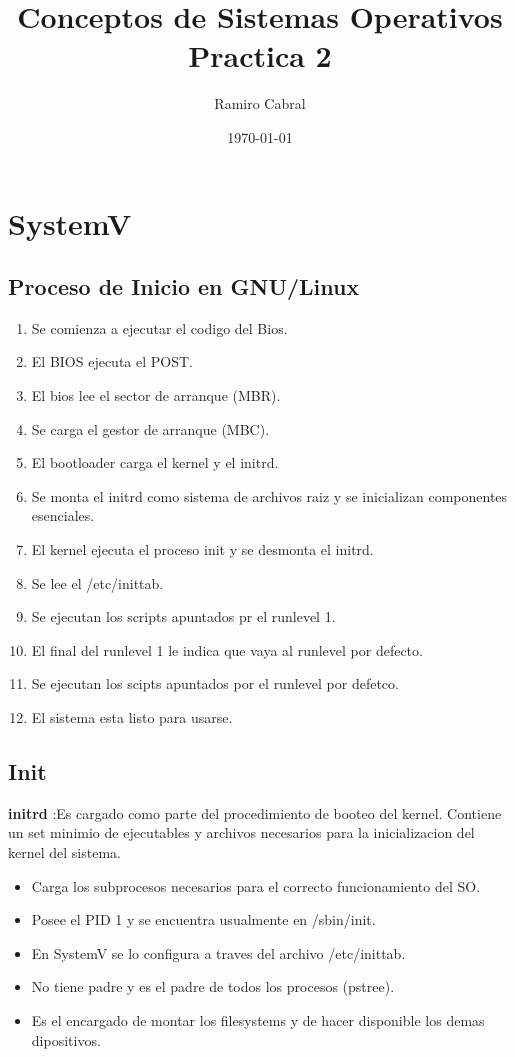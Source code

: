\documentclass[11pt]{article}
\title{\Huge{Conceptos de Sistemas Operativos\\
Practica 2}}
\author{\huge{Ramiro Cabral}}
\date{\today}
\begin{document}
\maketitle
\pagebreak

\section{SystemV}
\subsection{Proceso de Inicio en GNU/Linux}
\begin{enumerate}
    \item Se comienza a ejecutar el codigo del Bios.
    \item El BIOS ejecuta el POST.
    \item El bios lee el sector de arranque (MBR).
    \item Se carga el gestor de arranque (MBC).
    \item El bootloader carga el kernel y el initrd.
    \item Se monta el initrd como sistema de archivos raiz y se inicializan componentes esenciales.
    \item El kernel ejecuta el proceso init y se desmonta el initrd.
    \item Se lee el /etc/inittab.
    \item Se ejecutan los scripts apuntados pr el runlevel 1.
    \item El final del runlevel 1 le indica que vaya al runlevel por defecto.
    \item Se ejecutan los scipts apuntados por el runlevel por defetco.
    \item El sistema esta listo para usarse.
\end{enumerate}

\subsection{Init}
\textbf{initrd} :Es cargado como parte del procedimiento de booteo del kernel. Contiene un set minimio de ejecutables y archivos necesarios para la inicializacion del kernel del sistema.
\begin{itemize}
    \item Carga los subprocesos necesarios para el correcto funcionamiento del SO.
    \item Posee el PID 1 y se encuentra usualmente en /sbin/init.
    \item En SystemV se lo configura a traves del archivo /etc/inittab.
    \item No tiene padre y es el padre de todos los procesos (pstree).
    \item Es el encargado de montar los filesystems y de hacer disponible los demas dipositivos.
\end{itemize}
\end{document}
